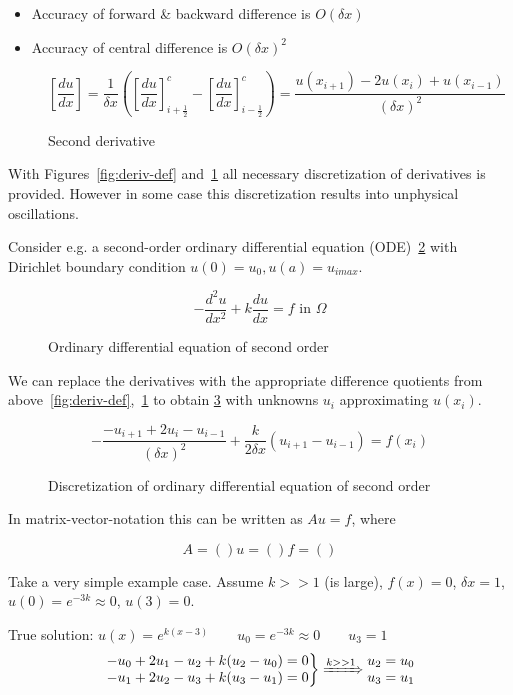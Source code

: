 \begin{itemize}
	\item Accuracy of forward \& backward difference is $O(\delta x)$
	\item Accuracy of central difference is $O(\delta x)^2$
\end{itemize}

\begin{figure}[H]
	\centering
	\[ \left[\frac{d u}{d x}\right] = \frac{1}{\delta x}\left(\left[\frac{d u}{d x}\right]^c_{i+\frac{1}{2}} - \left[\frac{d u}{d x}\right]^c_{i-\frac{1}{2}}\right) = \frac{u(x_{i+1}) - 2u(x_i) + u(x_{i-1})}{(\delta x)^2}  \]
    \renewcommand{\thefigure}{3.5}
	\caption{Second derivative}
	\label{fig:deriv-def2}
\end{figure}


With Figures~\ref{fig:deriv-def} and~\ref{fig:deriv-def2} all necessary discretization of derivatives is provided. However in some case this discretization results into unphysical oscillations.

Consider e.g. a second-order ordinary differential equation (ODE)~\ref{fig:ode} with Dirichlet boundary condition $u(0) = u_0, u(a) = u_{imax}$.
\begin{figure}[H]
	\centering
	\[ -\frac{d^2 u }{dx^2} + k \frac{du}{dx} = f \text{ in } \Omega \]
	\renewcommand{\thefigure}{3.6}
	\caption{Ordinary differential equation of second order}
	\label{fig:ode}
\end{figure}

We can replace the derivatives with the appropriate difference quotients from above~\ref{fig:deriv-def},~\ref{fig:deriv-def2} to obtain \ref{fig:disc-ode} with unknowns $u_i$ approximating $u(x_i)$.

\begin{figure}[H]
	\centering
	\[ -\frac{-u_{i+1} + 2u_i - u_{i-1}}{(\delta x)^2} + \frac{k}{2 \delta x} (u_{i+1} -u_{i-1}) = f(x_i)\]
	\renewcommand{\thefigure}{3.7}
	\caption{Discretization of ordinary differential equation of second order}
	\label{fig:disc-ode}
\end{figure}

In matrix-vector-notation this can be written as $Au = f$, where 

\[
A = ()  u = ()   f = ()
\]

Take a very simple example case. Assume $k >> 1$ (is large), $f(x) = 0$, $\delta x = 1$, $u(0) = e^{-3k} \approx 0$, $u(3) = 0$.

True solution: $u(x) = e^{k(x-3)} \qquad u_0 = e^{-3k} \approx 0 \qquad u_3 = 1$
\[\left.\begin{matrix}
	-u_0 + 2u_1 -u_2  + k(u_2 -u_0) =0\\
	-u_1 + 2u_2 - u_3 + k(u_3-u_1) = 0
	\end{matrix}\right\rbrace \xRightarrow{k >> 1}\begin{matrix}
	u_2 = u_0\\
	u_3 = u_1
	\end{matrix} \]

